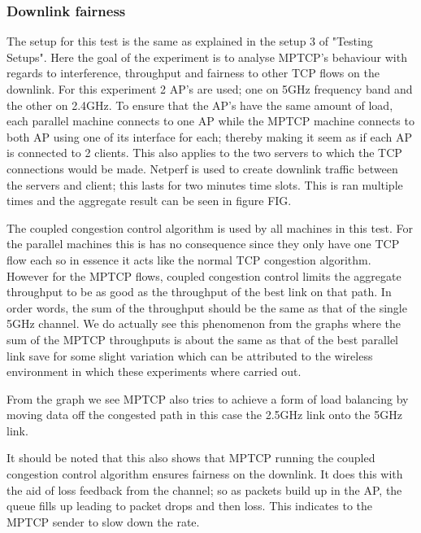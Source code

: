 \documentclass[12pt,a4paper]{article}
\begin{document}
\subsubsection{Downlink fairness}
The setup for this test is the same as explained in the setup 3 of "Testing
Setups". Here the goal of the experiment is to analyse MPTCP's behaviour with
regards to interference, throughput and fairness to other TCP flows on the
downlink. For this experiment 2 AP's are used; one on 5GHz frequency band and
the other on 2.4GHz. To ensure that the AP's have the same amount of load, each
parallel machine connects to one AP while the MPTCP machine connects to both AP
using one of its interface for each; thereby making it seem as if each AP is
connected to 2 clients. This also applies to the two servers to which the TCP
connections would be made. Netperf is used to create downlink traffic between
the servers and client; this lasts for two minutes time slots. This is ran
multiple times and the aggregate result can be seen in figure FIG.             %

The coupled congestion control algorithm is used by all machines in this test.
For the parallel machines this is has no consequence since they only have one
TCP flow each so in essence it acts like the normal TCP congestion algorithm.
However for the MPTCP flows, coupled congestion control limits the aggregate
throughput to be as good as the throughput of the best link on that path. In
order words, the sum of the throughput should be the same as that of the single
5GHz channel. We do actually see this phenomenon from the graphs where the sum
of the MPTCP throughputs is about the same as that of the best parallel link
save for some slight variation which can be attributed to the wireless
environment in which these experiments where carried out.

From the graph we see MPTCP also tries to achieve a form of load balancing by
moving data off the congested path in this case the 2.5GHz link onto the 5GHz
link.

It should be noted that this also shows that MPTCP running the coupled
congestion control algorithm ensures fairness on the downlink. It does this with
the aid of loss feedback from the channel; so as packets build up in the AP, the
queue fills up leading to packet drops and then loss. This indicates to the
MPTCP sender to slow down the rate.
\end{document}
